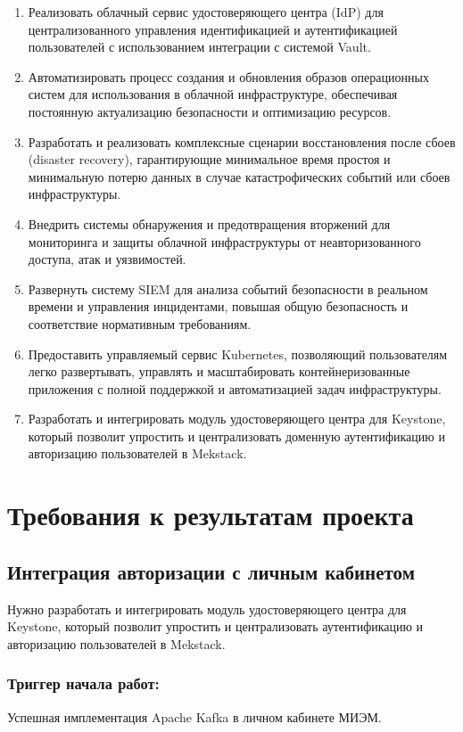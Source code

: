\documentclass[14pt, a4paper]{extarticle}
\begin{document}
\begin{enumerate}
\item Реализовать облачный сервис удостоверяющего центра (IdP) для централизованного управления идентификацией и аутентификацией пользователей с использованием интеграции с системой Vault.
\item Автоматизировать процесс создания и обновления образов операционных систем для использования в облачной инфраструктуре, обеспечивая постоянную актуализацию безопасности и оптимизацию ресурсов.
\item Разработать и реализовать комплексные сценарии восстановления после сбоев (disaster recovery), гарантирующие минимальное время простоя и минимальную потерю данных в случае катастрофических событий или сбоев инфраструктуры.
\item Внедрить системы обнаружения и предотвращения вторжений для мониторинга и защиты облачной инфраструктуры от неавторизованного доступа, атак и уязвимостей.
\item Развернуть систему SIEM для анализа событий безопасности в реальном времени и управления инцидентами, повышая общую безопасность и соответствие нормативным требованиям.
\item Предоставить управляемый сервис Kubernetes, позволяющий пользователям легко развертывать, управлять и масштабировать контейнеризованные приложения с полной поддержкой и автоматизацией задач инфраструктуры.
\item Разработать и интегрировать модуль удостоверяющего центра для Keystone, который позволит упростить и централизовать доменную аутентификацию и авторизацию пользователей в Mekstack.
\end{enumerate}

\section{Требования к результатам проекта}

\subsection{Интеграция авторизации с личным кабинетом}

Нужно разработать и интегрировать модуль удостоверяющего центра для Keystone, который позволит упростить и централизовать аутентификацию и авторизацию пользователей в Mekstack.

\subsubsection*{Триггер начала работ:}
Успешная имплементация Apache Kafka в личном кабинете МИЭМ.
\end{document}
